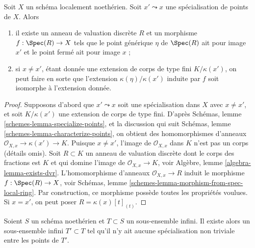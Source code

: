 \begin{lemma}
\label{lemma-locally-Noetherian-specialization-dvr}
Soit $X$ un schéma localement noethérien.
Soit $x' \leadsto x$ une spécialisation de points de $X$. Alors
\begin{enumerate}
\item il existe un anneau de valuation discrète $R$ et un morphisme
$f : \Spec(R) \to X$ tels que le point générique $\eta$ de
$\Spec(R)$ ait pour image $x'$ et le point fermé ait pour image $x$ ;
\item si $x \not = x'$, étant donnée une extension de corps de type fini
$K/\kappa(x')$, on peut faire en sorte que l'extension
$\kappa(\eta)/\kappa(x')$
induite par $f$ soit isomorphe à l'extension donnée.
\end{enumerate}
\end{lemma}

\begin{proof}
Supposons d'abord que $x' \leadsto x$ soit une spécialisation dans $X$
avec $x \not = x'$, et soit $K/\kappa(x')$ une extension
de corps de type fini. D'après
Schémas, lemme \ref{schemes-lemma-specialize-points},
et la discussion qui suit
Schémas, lemme \ref{schemes-lemma-characterize-points},
on obtient des homomorphismes d'anneaux $\mathcal{O}_{X, x} \to \kappa(x') \to K$.
Puisque $x \not = x'$, l'image de $\mathcal{O}_{X, x}$ dans $K$
n'est pas un corps (détails omis).
Soit $R \subset K$ un anneau de valuation discrète dont le corps des fractions est
$K$ et qui domine l'image de $\mathcal{O}_{X, x} \to K$, voir
Algèbre, lemme \ref{algebra-lemma-exists-dvr}.
L'homomorphisme d'anneaux $\mathcal{O}_{X, x} \to R$ induit le morphisme
$f : \Spec(R) \to X$, voir
Schémas, lemme \ref{schemes-lemma-morphism-from-spec-local-ring}.
Par construction, ce morphisme possède toutes les propriétés voulues.
Si $x = x'$, on peut poser $R = \kappa(x)[t]_{(t)}$.
\end{proof}

\begin{lemma}
\label{lemma-thin-infinite-sequence}
Soient $S$ un schéma noethérien et $T \subset S$ un sous-ensemble infini.
Il existe alors un sous-ensemble infini $T' \subset T$
tel qu'il n'y ait aucune spécialisation non triviale entre les points de $T'$.
\end{lemma}

